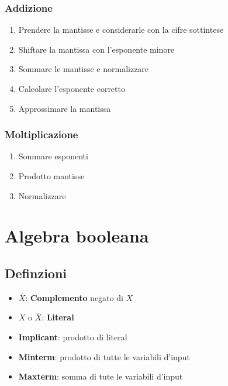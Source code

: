 \documentclass{report}
\newcommand{\n}[1]{\overline{#1}}
\begin{document}
        \subsubsection{Addizione}
        \begin{enumerate}
            \item Prendere la mantisse e considerarle con la cifre sottintese
            \item Shiftare la mantissa con l'esponente minore
            \item Sommare le mantisse e normalizzare
            \item Calcolare l'esponente corretto
            \item Approssimare la mantissa
        \end{enumerate}
        \subsubsection{Moltiplicazione}
        \begin{enumerate}
            \item Sommare esponenti
            \item Prodotto mantisse
            \item Normalizzare 
        \end{enumerate}
\newpage
\section{Algebra booleana}
    \subsection{Definzioni}
        \begin{itemize}
            \item $\n{X}$: \textbf{Complemento} negato di $X$
            \item $X$ o $\n{X}$: \textbf{Literal}
            \item \textbf{Implicant}: prodotto di literal
            \item \textbf{Minterm}: prodotto di tutte le variabili d'input
            \item \textbf{Maxterm}: somma di tute le variabili d'input
        \end{itemize}
\end{document}

